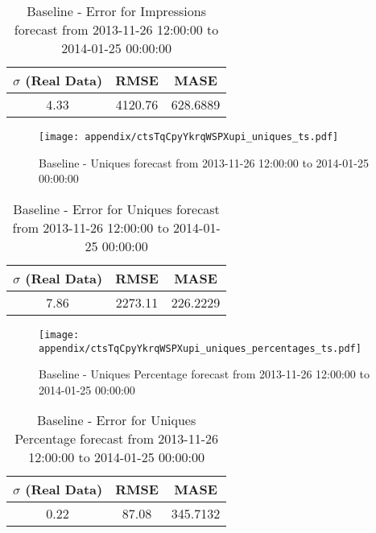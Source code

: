 \begin{table}[H]
\centering
\footnotesize
\begin{tabular}{ccc}
$\sigma$ (Real Data) & RMSE & MASE   \\ \hline
4.33 & 4120.76 & 628.6889 \\
\end{tabular}

\vspace{0.5cm}

\caption{
Baseline - Error for Impressions forecast from 2013-11-26 12:00:00 to 2014-01-25 00:00:00}
\end{table}

\begin{figure}[H] \begin{center} \leavevmode
\texttt{[image: appendix/ctsTqCpyYkrqWSPXupi\_uniques\_ts.pdf]} \caption{
Baseline - Uniques forecast from 2013-11-26 12:00:00 to 2014-01-25 00:00:00} \label{fig:appendix/ctsTqCpyYkrqWSPXupi_uniques_ts.pdf} \end{center}
\end{figure}

\begin{table}[H]
\centering
\footnotesize
\begin{tabular}{ccc}
$\sigma$ (Real Data) & RMSE & MASE   \\ \hline
7.86 & 2273.11 & 226.2229 \\
\end{tabular}

\vspace{0.5cm}

\caption{
Baseline - Error for Uniques forecast from 2013-11-26 12:00:00 to 2014-01-25 00:00:00}
\end{table}

\begin{figure}[H] \begin{center} \leavevmode
\texttt{[image: appendix/ctsTqCpyYkrqWSPXupi\_uniques\_percentages\_ts.pdf]} \caption{
Baseline - Uniques Percentage forecast from 2013-11-26 12:00:00 to 2014-01-25 00:00:00} \label{fig:appendix/ctsTqCpyYkrqWSPXupi_uniques_percentages_ts.pdf} \end{center}
\end{figure}

\begin{table}[H]
\centering
\footnotesize
\begin{tabular}{ccc}
$\sigma$ (Real Data) & RMSE & MASE   \\ \hline
0.22 & 87.08 & 345.7132 \\
\end{tabular}

\vspace{0.5cm}

\caption{
Baseline - Error for Uniques Percentage forecast from 2013-11-26 12:00:00 to 2014-01-25 00:00:00}
\end{table}

